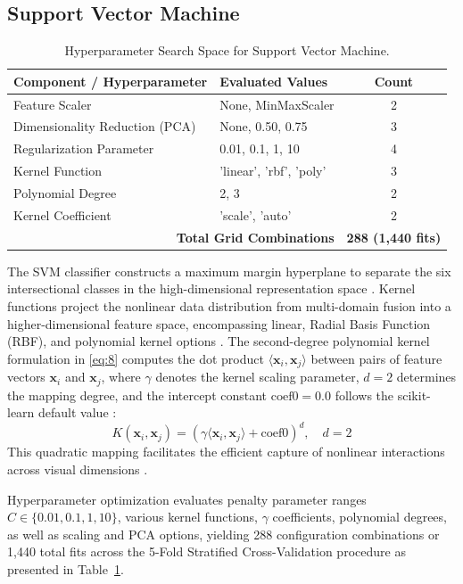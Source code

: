 \subsection{Support Vector Machine}
\label{sec:support_vector_machine}

\begin{table}[htbp]
\caption{Hyperparameter Search Space for Support Vector Machine.}
\label{tab:VI}
\centering
\begin{tabular}{llc}
\toprule
Component / Hyperparameter & Evaluated Values & Count \\
\midrule
Feature Scaler & None, MinMaxScaler & 2 \\
Dimensionality Reduction (PCA) & None, 0.50, 0.75 & 3 \\
Regularization Parameter & 0.01, 0.1, 1, 10 & 4 \\
Kernel Function & 'linear', 'rbf', 'poly' & 3 \\
Polynomial Degree & 2, 3 & 2 \\
Kernel Coefficient & 'scale', 'auto' & 2 \\
\midrule
\multicolumn{2}{r}{\textbf{Total Grid Combinations}} & \textbf{288 (1,440 fits)} \\
\bottomrule
\end{tabular}
\end{table}

The SVM classifier constructs a maximum margin hyperplane to separate the six intersectional classes in the high-dimensional representation space \cite{ref40}. Kernel functions project the nonlinear data distribution from multi-domain fusion into a higher-dimensional feature space, encompassing linear, Radial Basis Function (RBF), and polynomial kernel options \cite{ref41}. The second-degree polynomial kernel formulation in \eqref{eq:8} computes the dot product $\langle \mathbf{x}_i, \mathbf{x}_j \rangle$ between pairs of feature vectors $\mathbf{x}_i$ and $\mathbf{x}_j$, where $\gamma$ denotes the kernel scaling parameter, $d = 2$ determines the mapping degree, and the intercept constant $\text{coef0} = 0.0$ follows the scikit-learn default value \cite{ref42}:
\begin{equation}
K(\mathbf{x}_i, \mathbf{x}_j) = (\gamma \langle \mathbf{x}_i, \mathbf{x}_j \rangle + \text{coef0})^d, \quad d = 2
\label{eq:8}
\end{equation}
This quadratic mapping facilitates the efficient capture of nonlinear interactions across visual dimensions \cite{ref43}.

Hyperparameter optimization evaluates penalty parameter ranges $C \in \{0.01, 0.1, 1, 10\}$, various kernel functions, $\gamma$ coefficients, polynomial degrees, as well as scaling and PCA options, yielding 288 configuration combinations or 1,440 total fits across the 5-Fold Stratified Cross-Validation procedure as presented in Table~\ref{tab:VI}.
